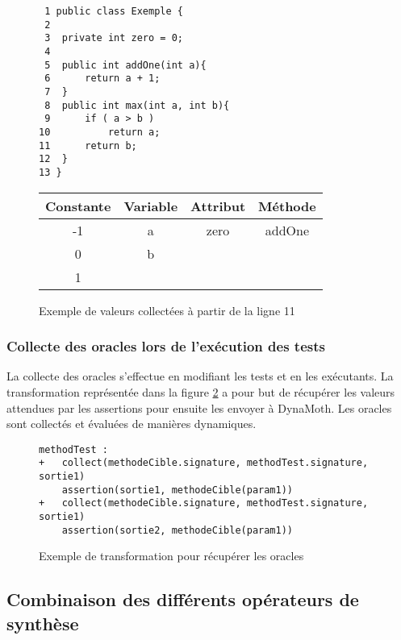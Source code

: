 \begin{figure}[H]
\begin{lstlisting}
 1 public class Exemple {
 2 
 3	private int zero = 0;
 4
 5	public int addOne(int a){
 6		return a + 1;
 7	}
 8	public int max(int a, int b){
 9		if ( a > b )
10			return a;
11		return b;	
12	}
13 }
\end{lstlisting}
\begin{center}

\begin{tabular}{|c|c|c|c|}
\hline
Constante & Variable & Attribut & Méthode  \\
\hline
-1 & a & zero & addOne\\
\hline
0  & b & &\\
\hline
1  &  & & \\
 \hline
\end{tabular}

\end{center}
\label{fig:exemple_collecte}
\caption{Exemple de valeurs collectées à partir de la ligne 11}
\end{figure}

\subsubsection{Collecte des oracles lors de l'exécution des tests}
\label{subsec:collecte_sorties}
\par La collecte des oracles s'effectue en modifiant les tests et en les exécutants. La transformation représentée dans la figure \ref{fig:collect_sorties} a pour but de récupérer les valeurs attendues par les assertions pour ensuite les envoyer à DynaMoth. Les oracles sont collectés et évaluées de manières dynamiques.

\begin{figure}[H]
\begin{lstlisting}
methodTest :
+   collect(methodeCible.signature, methodTest.signature, sortie1)
    assertion(sortie1, methodeCible(param1))
+   collect(methodeCible.signature, methodTest.signature, sortie1)
    assertion(sortie2, methodeCible(param1))
\end{lstlisting}
\caption{Exemple de transformation pour récupérer les oracles}
\label{fig:collect_sorties}
\end{figure}

\subsection{Combinaison des différents opérateurs de synthèse}
\label{subsec:combinaisons}

